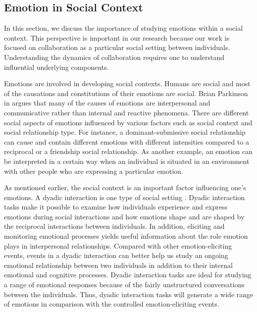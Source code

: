\documentclass[12pt]{report}
\begin{document}
\subsection{Emotion in Social Context}
\label{section-emotion-social}

In this section, we discuss the importance of studying emotions within a social
context. This perspective is important in our research because our work is
focused on collaboration as a particular social setting between individuals.
Understanding the dynamics of collaboration requires one to understand
influential underlying components.

Emotions are involved in developing social contexts. Humans are social and most
of the causations and constitutions of their emotions are social. Brian
Parkinson in \cite{parkinson:emotions-social} argues that many of the causes of
emotions are interpersonal and communicative rather than internal and reactive
phenomena. There are different social aspects of emotions influenced by various
factors such as social context and social relationship type. For instance, a
dominant-submissive social relationship can cause and contain different emotions
with different intensities compared to a reciprocal or a friendship social
relationship. As another example, an emotion can be interpreted in a certain way
when an individual is situated in an environment with other people who are
expressing a particular emotion.

As mentioned earlier, the social context is an important factor influencing
one's emotions. A dyadic interaction is one type of social setting
\cite{coan:emotion-dyadic}. Dyadic interaction tasks make it possible to examine
how individuals experience and express emotions during social interactions and
how emotions shape and are shaped by the reciprocal interactions between
individuals. In addition, eliciting and monitoring emotional processes yields
useful information about the role emotion plays in interpersonal relationships.
Compared with other emotion-eliciting events, events in a dyadic interaction can
better help us study an ongoing emotional relationship between two individuals
in addition to their internal emotional and cognitive processes. Dyadic
interaction tasks are ideal for studying a range of emotional responses because
of the fairly unstructured conversations between the individuals. Thus, dyadic
interaction tasks will generate a wide range of emotions in comparison with the
controlled emotion-eliciting events.
\end{document}
